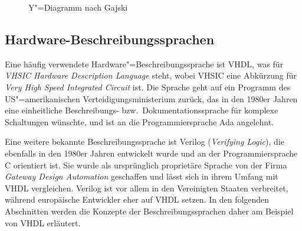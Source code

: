 \begin{figure}[htb]
    \caption{Y"=Diagramm nach Gajski \cite[nach][10]{kesel2013}}
    \label{fpga:entwicklung:ydiagramm}
\end{figure}

\subsection{Hardware-Beschreibungssprachen}\label{fpga:entwicklung:hdl}

Eine häufig verwendete Hardware"=Beschreibungssprache ist VHDL, was für
\textit{VHSIC Hardware Description Language} steht, wobei VHSIC eine Abkürzung
für \textit{Very High Speed Integrated Circuit} ist. Die Sprache geht auf ein
Programm des US"=amerikanischen Verteidigungsministerium zurück, das in den
1980er Jahren eine einheitliche Beschreibungs- bzw.\ Dokumentationssprache für
komplexe Schaltungen wünschte, und ist an die Programmiersprache Ada angelehnt.
\cite[vgl.][22]{kesel2013}

Eine weitere bekannte Beschreibungssprache ist Verilog
(\textit{Verifying Logic}), die ebenfalls in den 1980er Jahren entwickelt wurde
und an der Programmiersprache C orientiert ist. Sie wurde als ursprünglich
proprietäre Sprache von der Firma \textit{Gateway Design Automation} geschaffen
und lässt sich in ihrem Umfang mit VHDL vergleichen. Verilog ist vor allem in
den Vereinigten Staaten verbreitet, während europäische Entwickler eher auf VHDL
setzen. In den folgenden Abschnitten werden die Konzepte der
Beschreibungssprachen daher am Beispiel von VHDL erläutert.
\cite[vgl.][24--25]{kesel2013}

